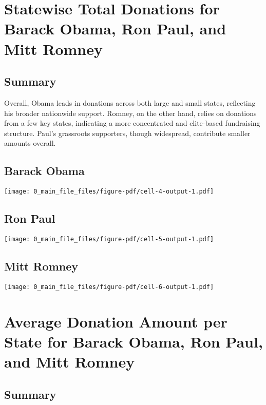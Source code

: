 \documentclass[
  letterpaper,
  DIV=11,
  numbers=noendperiod]{scrartcl}
\begin{document}
\section{Statewise Total Donations for Barack Obama, Ron Paul, and Mitt
Romney}\label{statewise-total-donations-for-barack-obama-ron-paul-and-mitt-romney}

\subsection{Summary}\label{summary-1}

Overall, Obama leads in donations across both large and small states,
reflecting his broader nationwide support. Romney, on the other hand,
relies on donations from a few key states, indicating a more
concentrated and elite-based fundraising structure. Paul's grassroots
supporters, though widespread, contribute smaller amounts overall.

\subsection{Barack Obama}\label{barack-obama}

\texttt{[image: 0\_main\_file\_files/figure-pdf/cell-4-output-1.pdf]}

\subsection{Ron Paul}\label{ron-paul}

\texttt{[image: 0\_main\_file\_files/figure-pdf/cell-5-output-1.pdf]}

\subsection{Mitt Romney}\label{mitt-romney}

\texttt{[image: 0\_main\_file\_files/figure-pdf/cell-6-output-1.pdf]}

\section{Average Donation Amount per State for Barack Obama, Ron Paul,
and Mitt
Romney}\label{average-donation-amount-per-state-for-barack-obama-ron-paul-and-mitt-romney}

\subsection{Summary}\label{summary-2}
\end{document}
